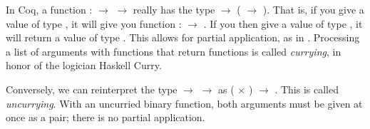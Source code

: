 \documentclass[12pt]{report}
\begin{document}
 In Coq, a function  :  \ensuremath{\rightarrow}  \ensuremath{\rightarrow}  really has the type 
    \ensuremath{\rightarrow} ( \ensuremath{\rightarrow} ).  That is, if you give  a value of type , it
    will give you function  :  \ensuremath{\rightarrow} .  If you then give  a
    value of type , it will return a value of type .  This
    allows for partial application, as in .  Processing a list
    of arguments with functions that return functions is called
    \textit{currying}, in honor of the logician Haskell Curry.


    Conversely, we can reinterpret the type  \ensuremath{\rightarrow}  \ensuremath{\rightarrow}  as ( \ensuremath{\times}
    ) \ensuremath{\rightarrow} .  This is called \textit{uncurrying}.  With an uncurried binary
    function, both arguments must be given at once as a pair; there is
    no partial application. 
\end{document}
